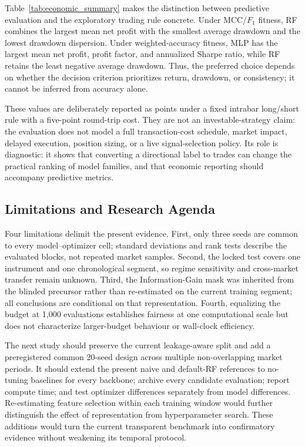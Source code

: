 Table~\ref{tab:economic_summary} makes the distinction between predictive evaluation and the exploratory trading rule concrete. Under MCC/$F_1$ fitness, RF combines the largest mean net profit with the smallest average drawdown and the lowest drawdown dispersion. Under weighted-accuracy fitness, MLP has the largest mean net profit, profit factor, and annualized Sharpe ratio, while RF retains the least negative average drawdown. Thus, the preferred choice depends on whether the decision criterion prioritizes return, drawdown, or consistency; it cannot be inferred from accuracy alone.

These values are deliberately reported as points under a fixed intrabar long/short rule with a five-point round-trip cost. They are not an investable-strategy claim: the evaluation does not model a full transaction-cost schedule, market impact, delayed execution, position sizing, or a live signal-selection policy. Its role is diagnostic: it shows that converting a directional label to trades can change the practical ranking of model families, and that economic reporting should accompany predictive metrics.

\subsection{Limitations and Research Agenda}

Four limitations delimit the present evidence. First, only three seeds are common to every model--optimizer cell; standard deviations and rank tests describe the evaluated blocks, not repeated market samples. Second, the locked test covers one instrument and one chronological segment, so regime sensitivity and cross-market transfer remain unknown. Third, the Information-Gain mask was inherited from the blinded precursor rather than re-estimated on the current training segment; all conclusions are conditional on that representation. Fourth, equalizing the budget at 1,000 evaluations establishes fairness at one computational scale but does not characterize larger-budget behaviour or wall-clock efficiency.

The next study should preserve the current leakage-aware split and add a preregistered common 20-seed design across multiple non-overlapping market periods. It should extend the present naive and default-RF references to no-tuning baselines for every backbone; archive every candidate evaluation; report compute time; and test optimizer differences separately from model differences. Re-estimating feature selection within each training window would further distinguish the effect of representation from hyperparameter search. These additions would turn the current transparent benchmark into confirmatory evidence without weakening its temporal protocol.
